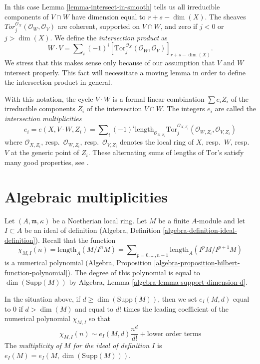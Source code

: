 \noindent
In this case Lemma \ref{lemma-intersect-in-smooth} tells us all irreducible
components of $V \cap W$ have dimension equal to $r + s - \dim(X)$.
The sheaves $Tor_j^{\mathcal{O}_X}(\mathcal{O}_W, \mathcal{O}_V)$ are
coherent, supported on $V \cap W$, and zero if $j < 0$ or $j > \dim(X)$.
We define the {\it intersection product} as
$$
W \cdot V = \sum\nolimits_i (-1)^i
[\text{Tor}_j^{\mathcal{O}_X}(\mathcal{O}_W, \mathcal{O}_V)]_{r + s - \dim(X)}.
$$
We stress that this makes sense only because of our assumption that
$V$ and $W$ intersect properly. This fact will necessitate a moving
lemma in order to define the intersection product in general.

\medskip\noindent
With this notation, the cycle $V \cdot W$ is a formal linear
combination $\sum e_i Z_i$ of the irreducible components $Z_i$
of the intersection $V \cap W$. The integers $e_i$ are called
the {\it intersection multiplicities}
$$
e_i = e(X, V \cdot W, Z_i) =
\sum\nolimits_i
(-1)^i
\text{length}_{\mathcal{O}_{X, Z_i}}
\text{Tor}_j^{\mathcal{O}_{X, Z_i}}(\mathcal{O}_{W, Z_i}, \mathcal{O}_{V, Z_i})
$$
where $\mathcal{O}_{X, Z_i}$, resp.\ $\mathcal{O}_{W, Z_i}$, resp.\ $\mathcal{O}_{V, Z_i}$ denotes the local ring of $X$, resp.\ $W$, resp.\ $V$ at the
generic point of $Z_i$.
These alternating sums of lengths of $\text{Tor}$'s satisfy many good
properties, see \cite{Serre_algebre_locale}.







\section{Algebraic multiplicities}
\label{section-multiplicities}

\noindent
Let $(A, \mathfrak m, \kappa)$ be a Noetherian local ring.
Let $M$ be a finite $A$-module and let $I \subset A$ be an ideal
of definition (Algebra, Definition \ref{algebra-definition-ideal-definition}).
Recall that the function
$$
\chi_{M, I}(n) = \text{length}_A(M/I^nM) =
\sum\nolimits_{p = 0, \ldots, n - 1} \text{length}_A(I^pM/I^{p + 1}M)
$$
is a numerical polynomial
(Algebra, Proposition \ref{algebra-proposition-hilbert-function-polynomial}).
The degree of this polynomial is equal to $\dim(\text{Supp}(M))$ by
Algebra, Lemma \ref{algebra-lemma-support-dimension-d}.

\begin{definition}
\label{definition-multiplicity}
In the situation above, if $d \geq \dim(\text{Supp}(M))$, then we set
$e_I(M, d)$ equal to $0$ if $d > \dim(M)$ and equal to $d!$ times the
leading coefficient of the numerical polynomial $\chi_{M, I}$ so that
$$
\chi_{M, I}(n) \sim e_I(M, d) \frac{n^d}{d!} + \text{lower order terms}
$$
The {\it multiplicity of $M$ for the ideal of definition $I$}
is $e_I(M) = e_I(M, \dim(\text{Supp}(M)))$.
\end{definition}


